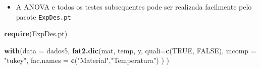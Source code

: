 \documentclass[
]{book}
\newenvironment{Shaded}{\begin{snugshade}}{\end{snugshade}}
\newcommand{\AttributeTok}[1]{\textcolor[rgb]{0.13,0.29,0.53}{#1}}
\newcommand{\ConstantTok}[1]{\textcolor[rgb]{0.56,0.35,0.01}{#1}}
\newcommand{\FunctionTok}[1]{\textcolor[rgb]{0.13,0.29,0.53}{\textbf{#1}}}
\newcommand{\NormalTok}[1]{#1}
\newcommand{\StringTok}[1]{\textcolor[rgb]{0.31,0.60,0.02}{#1}}
\providecommand{\tightlist}{%
  \setlength{\itemsep}{0pt}\setlength{\parskip}{0pt}}
\begin{document}
\begin{itemize}
\tightlist
\item
  A ANOVA e todos os testes subsequentes pode ser realizada facilmente pelo pacote \texttt{ExpDes.pt}
\end{itemize}

\begin{Shaded}
\begin{Highlighting}[]
\FunctionTok{require}\NormalTok{(ExpDes.pt)}

\FunctionTok{with}\NormalTok{(}\AttributeTok{data =}\NormalTok{ dados5,}
     \FunctionTok{fat2.dic}\NormalTok{(mat, temp, y,}
              \AttributeTok{quali=}\FunctionTok{c}\NormalTok{(}\ConstantTok{TRUE}\NormalTok{, }\ConstantTok{FALSE}\NormalTok{),}
              \AttributeTok{mcomp =} \StringTok{"tukey"}\NormalTok{,}
              \AttributeTok{fac.names =} \FunctionTok{c}\NormalTok{(}\StringTok{"Material"}\NormalTok{,}\StringTok{"Temperatura"}\NormalTok{)}
\NormalTok{              )}
\NormalTok{     )}
\end{Highlighting}
\end{Shaded}
\end{document}

